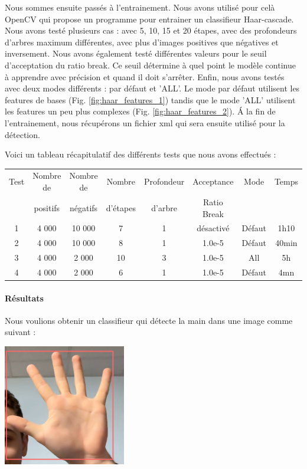 \documentclass[11pt]{article}
\begin{document}
Nous sommes ensuite passés à l'entrainement. Nous avons utilisé pour celà OpenCV \cite{opencv} qui propose un programme pour entrainer un classifieur Haar-cascade. Nous avons testé plusieurs cas : avec 5, 10, 15 et 20 étapes, avec des profondeurs d'arbres maximum différentes, avec plus d'images positives que négatives et inversement. Nous avons également testé différentes valeurs pour le seuil d'acceptation du ratio break. Ce seuil détermine à quel point le modèle continue à apprendre avec précision et quand il doit s'arrêter. Enfin, nous avons testés avec deux modes différents : par défaut et 'ALL'. Le mode par défaut utilisent les features de bases (Fig. \ref{fig:haar_features_1}) tandis que le mode 'ALL' utilisent les features un peu plus complexes (Fig. \ref{fig:haar_features_2}). \'A la fin de l'entrainement, nous récupérons un fichier xml qui sera ensuite utilisé pour la détection.\bigbreak

\bigbreak

\noindent Voici un tableau récapitulatif des différents tests que nous avons effectués : \bigbreak

\begin{center} 
    \begin{tabular}{|c|c|c|c|c|c|c|c|}
        \hline
        Test & Nombre de & Nombre de & Nombre & Profondeur & Acceptance  & Mode & Temps \\
        & positifs & négatifs & d'étapes & d'arbre & Ratio Break &  &  \\ 
        \hline 
        1 & 4 000 & 10 000 & 7 & 1 & désactivé & Défaut & 1h10 \\ 
        \hline
        2 & 4 000 & 10 000 & 8 & 1 & 1.0e-5 & Défaut & 40min \\
        \hline
        3 & 4 000 & 2 000 & 10 & 3 & 1.0e-5 & All & 5h \\
        \hline
        4 & 4 000 & 2 000 & 6 & 1 & 1.0e-5 & Défaut & 4mn \\
        \hline
    \end{tabular}
\end{center}

\bigbreak

\paragraph{Résultats}
Nous voulions obtenir un classifieur qui détecte la main dans une image comme suivant : 
\begin{center}
    \includegraphics[width=0.4\textwidth]{images/res_attendu.png}
\end{center}
\end{document}
